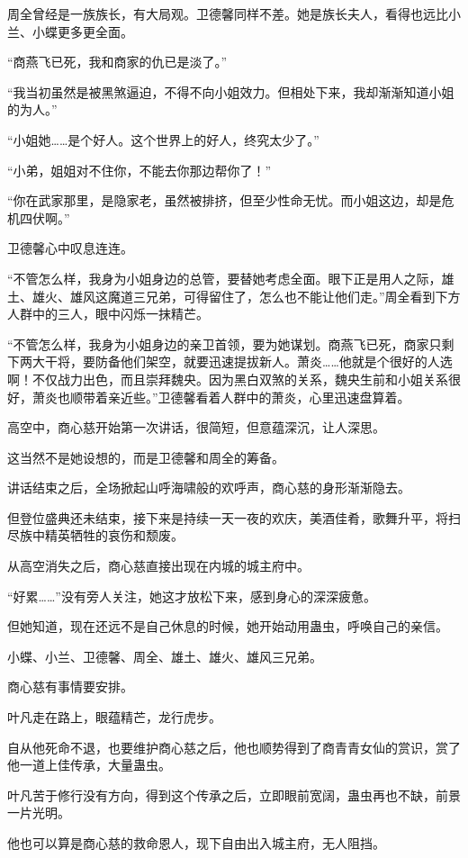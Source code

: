 \begin{this_body}
周全曾经是一族族长，有大局观。卫德馨同样不差。她是族长夫人，看得也远比小兰、小蝶更多更全面。

“商燕飞已死，我和商家的仇已是淡了。”

“我当初虽然是被黑煞逼迫，不得不向小姐效力。但相处下来，我却渐渐知道小姐的为人。”

“小姐她……是个好人。这个世界上的好人，终究太少了。”

“小弟，姐姐对不住你，不能去你那边帮你了！”

“你在武家那里，是隐家老，虽然被排挤，但至少性命无忧。而小姐这边，却是危机四伏啊。”

卫德馨心中叹息连连。

“不管怎么样，我身为小姐身边的总管，要替她考虑全面。眼下正是用人之际，雄土、雄火、雄风这魔道三兄弟，可得留住了，怎么也不能让他们走。”周全看到下方人群中的三人，眼中闪烁一抹精芒。

“不管怎么样，我身为小姐身边的亲卫首领，要为她谋划。商燕飞已死，商家只剩下两大干将，要防备他们架空，就要迅速提拔新人。萧炎……他就是个很好的人选啊！不仅战力出色，而且崇拜魏央。因为黑白双煞的关系，魏央生前和小姐关系很好，萧炎也顺带着亲近些。”卫德馨看着人群中的萧炎，心里迅速盘算着。

高空中，商心慈开始第一次讲话，很简短，但意蕴深沉，让人深思。

这当然不是她设想的，而是卫德馨和周全的筹备。

讲话结束之后，全场掀起山呼海啸般的欢呼声，商心慈的身形渐渐隐去。

但登位盛典还未结束，接下来是持续一天一夜的欢庆，美酒佳肴，歌舞升平，将扫尽族中精英牺牲的哀伤和颓废。

从高空消失之后，商心慈直接出现在内城的城主府中。

“好累……”没有旁人关注，她这才放松下来，感到身心的深深疲惫。

但她知道，现在还远不是自己休息的时候，她开始动用蛊虫，呼唤自己的亲信。

小蝶、小兰、卫德馨、周全、雄土、雄火、雄风三兄弟。

商心慈有事情要安排。

叶凡走在路上，眼蕴精芒，龙行虎步。

自从他死命不退，也要维护商心慈之后，他也顺势得到了商青青女仙的赏识，赏了他一道上佳传承，大量蛊虫。

叶凡苦于修行没有方向，得到这个传承之后，立即眼前宽阔，蛊虫再也不缺，前景一片光明。

他也可以算是商心慈的救命恩人，现下自由出入城主府，无人阻挡。


\end{this_body}
